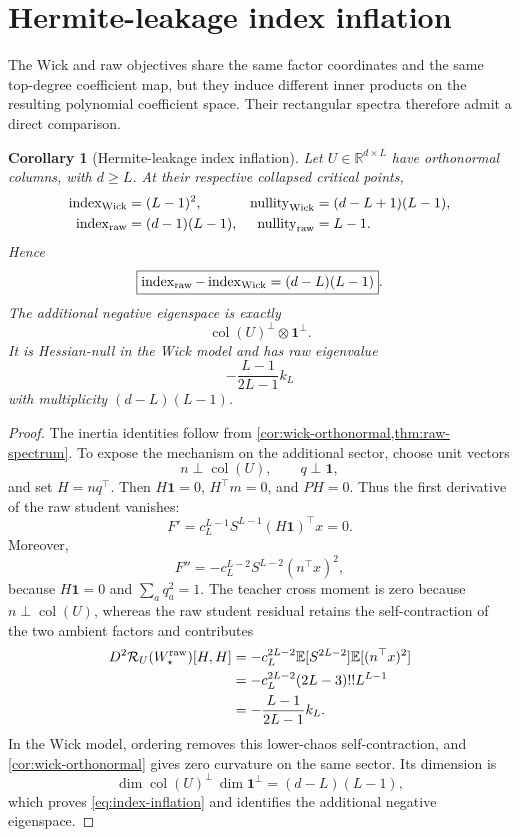 \documentclass[11pt]{article}
\newtheorem{corollary}[theorem]{Corollary}
\newcommand{\R}{\mathbb{R}}
\newcommand{\one}{\mathbf{1}}
\newcommand{\ind}{\operatorname{index}}
\newcommand{\nul}{\operatorname{nullity}}
\newcommand{\col}{\operatorname{col}}
\begin{document}
\section{Hermite-leakage index inflation}

The Wick and raw objectives share the same factor coordinates and the same top-degree coefficient map, but they induce different inner products on the resulting polynomial coefficient space.  Their rectangular spectra therefore admit a direct comparison.

\begin{corollary}[Hermite-leakage index inflation]
\label{thm:hermite-leakage}
Let $U\in\R^{d\times L}$ have orthonormal columns, with $d\geq L$.  At their respective collapsed critical points,
\begin{align}
\ind_{\rm Wick}&=(L-1)^2,
&\nul_{\rm Wick}&=(d-L+1)(L-1),\\
\ind_{\rm raw}&=(d-1)(L-1),
&\nul_{\rm raw}&=L-1.
\end{align}
Hence
\begin{equation}
\boxed{
\ind_{\rm raw}-\ind_{\rm Wick}=(d-L)(L-1)
}.
\label{eq:index-inflation}
\end{equation}
The additional negative eigenspace is exactly
\[
\col(U)^\perp\otimes\one^\perp.
\]
It is Hessian-null in the Wick model and has raw eigenvalue
\begin{equation}
-\frac{L-1}{2L-1}k_L
\label{eq:ambient-raw-negative}
\end{equation}
with multiplicity $(d-L)(L-1)$.
\end{corollary}

\begin{proof}
The inertia identities follow from \cref{cor:wick-orthonormal,thm:raw-spectrum}.  To expose the mechanism on the additional sector, choose unit vectors
\[
n\perp\col(U),\qquad q\perp\one,
\]
and set $H=nq^\top$.  Then $H\one=0$, $H^\top m=0$, and $PH=0$.  Thus the first derivative of the raw student vanishes:
\[
F'=c_L^{L-1}S^{L-1}(H\one)^\top x=0.
\]
Moreover,
\[
F''=-c_L^{L-2}S^{L-2}(n^\top x)^2,
\]
because $H\one=0$ and $\sum_a q_a^2=1$.  The teacher cross moment is zero because $n\perp\col(U)$, whereas the raw student residual retains the self-contraction of the two ambient factors and contributes
\begin{align*}
D^2\mathcal R_U(W_\star^{\rm raw})[H,H]
&=-c_L^{2L-2}\mathbb E[S^{2L-2}]\mathbb E[(n^\top x)^2]\\
&=-c_L^{2L-2}(2L-3)!!L^{L-1}\\
&=-\frac{L-1}{2L-1}k_L.
\end{align*}
In the Wick model, ordering removes this lower-chaos self-contraction, and \cref{cor:wick-orthonormal} gives zero curvature on the same sector.  Its dimension is
\[
\dim\col(U)^\perp\,\dim\one^\perp=(d-L)(L-1),
\]
which proves \eqref{eq:index-inflation} and identifies the additional negative eigenspace.
\end{proof}
\end{document}

